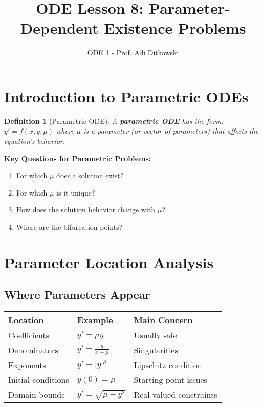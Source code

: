 \documentclass[12pt]{article}
\title{ODE Lesson 8: Parameter-Dependent Existence Problems}
\author{ODE 1 - Prof. Adi Ditkowski}
\date{}
\newtheorem{definition}{Definition}
\begin{document}
\maketitle

\section{Introduction to Parametric ODEs}

\begin{definition}[Parametric ODE]
A \textbf{parametric ODE} has the form:
$y' = f(x, y; \mu)$
where $\mu$ is a parameter (or vector of parameters) that affects the equation's behavior.
\end{definition}

\begin{keypoint}
\textbf{Key Questions for Parametric Problems:}
\begin{enumerate}
    \item For which $\mu$ does a solution exist?
    \item For which $\mu$ is it unique?
    \item How does the solution behavior change with $\mu$?
    \item Where are the bifurcation points?
\end{enumerate}
\end{keypoint}

\section{Parameter Location Analysis}

\subsection{Where Parameters Appear}

\begin{table}[h]
\centering
\begin{tabular}{|l|l|l|}
\hline
\textbf{Location} & \textbf{Example} & \textbf{Main Concern} \\
\hline
Coefficients & $y' = \mu y$ & Usually safe \\
Denominators & $y' = \frac{y}{x-\mu}$ & Singularities \\
Exponents & $y' = |y|^\mu$ & Lipschitz condition \\
Initial conditions & $y(0) = \mu$ & Starting point issues \\
Domain bounds & $y' = \sqrt{\mu - y^2}$ & Real-valued constraints \\
\hline
\end{tabular}
\end{table}
\end{document}
